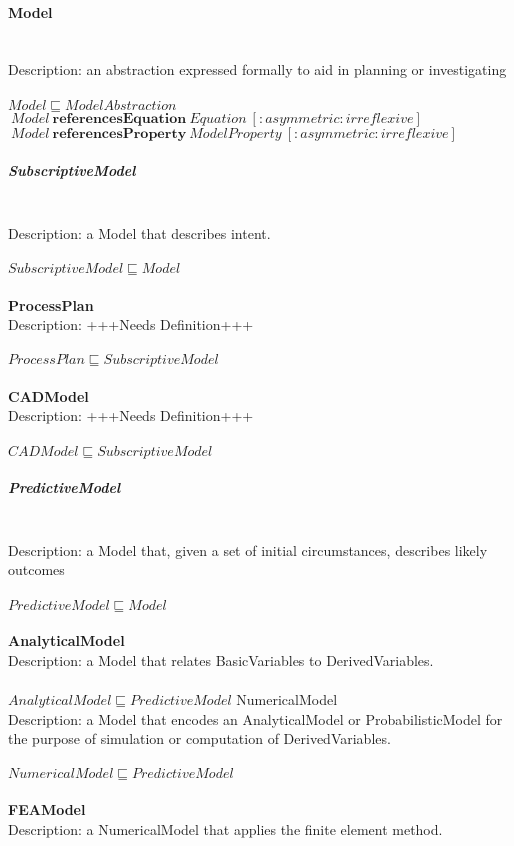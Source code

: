 \paragraph{Model}\\
Description: an abstraction expressed formally to aid in planning or investigating\\
\\$ Model \sqsubseteq ModelAbstraction$
\\$\: Model\: \textbf{referencesEquation}\: Equation\: [:asymmetric :irreflexive]$
\\$\: Model\: \textbf{referencesProperty}\: ModelProperty\: [:asymmetric :irreflexive]$
\subparagraph{SubscriptiveModel}\\
Description: a Model that describes intent.\\
\\$ SubscriptiveModel \sqsubseteq Model$
\\\\   \textbf{ProcessPlan}\\Description: +++Needs Definition+++\\
\\$ ProcessPlan \sqsubseteq SubscriptiveModel$
\\\\   \textbf{CADModel}\\Description: +++Needs Definition+++\\
\\$ CADModel \sqsubseteq SubscriptiveModel$
\subparagraph{PredictiveModel}\\
Description: a Model that, given a set of initial circumstances, describes likely outcomes\\
\\$ PredictiveModel \sqsubseteq Model$
\\\\   \textbf{AnalyticalModel}\\Description: a Model that relates BasicVariables to DerivedVariables.\\
\\$ AnalyticalModel \sqsubseteq PredictiveModel$
{NumericalModel}\\
Description: a Model that encodes an AnalyticalModel or ProbabilisticModel for the purpose of simulation or computation of DerivedVariables.\\
\\$ NumericalModel \sqsubseteq PredictiveModel$
\\\\   \textbf{FEAModel}\\Description: a NumericalModel that applies the finite element method.\\
